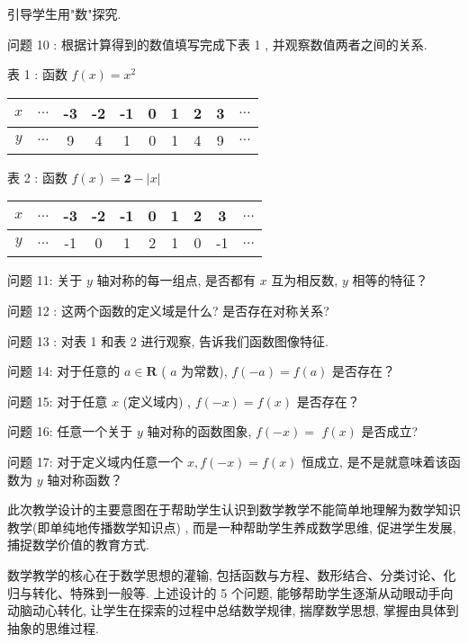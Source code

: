 \begin{activity}
	引导学生用"数"探究.

	问题 10 : 根据计算得到的数值填写完成下表 1 , 并观察数值两者之间的关系.

	表 1 : 函数 $f(x)=x^{2}$

	\begin{center}
		\begin{tabular}{|c|c|c|c|c|c|c|c|c|c|}
			\hline
			$x$ & $\ldots$ & -3 & -2 & -1 & 0 & 1 & 2 & 3 & $\ldots$ \\
			\hline
			$y$ & $\ldots$ & 9  & 4  & 1  & 0 & 1 & 4 & 9 & $\ldots$ \\
			\hline
		\end{tabular}
	\end{center}

	表 2 : 函数 $f(x)=\mathbf{2}-|x|$

	\begin{center}
		\begin{tabular}{|c|c|c|c|c|c|c|c|c|c|}
			\hline
			$x$ & $\ldots$ & -3 & -2 & -1 & 0 & 1 & 2 & 3  & $\ldots$ \\
			\hline
			$y$ & $\ldots$ & -1 & 0  & 1  & 2 & 1 & 0 & -1 & $\ldots$ \\
			\hline
		\end{tabular}
	\end{center}

	问题 11: 关于 $y$ 轴对称的每一组点, 是否都有 $x$ 互为相反数,  $y$ 相等的特征？

	问题 12 : 这两个函数的定义域是什么? 是否存在对称关系?

	问题 13 : 对表 1 和表 2 进行观察, 告诉我们函数图像特征.

	问题 14: 对于任意的 $a \in \mathbf{R}$ ( $a$ 为常数), $f(-a)=f(a)$ 是否存在？

	问题 15: 对于任意 $x$ (定义域内) ,  $f(-x)=f(x)$ 是否存在？

	问题 16: 任意一个关于 $y$ 轴对称的函数图象,  $f(-x)=$ $f(x)$ 是否成立?

	问题 17: 对于定义域内任意一个 $x, f(-x)=f(x)$ 恒成立, 是不是就意味着该函数为 $y$ 轴对称函数？

\end{activity}
\begin{purpose}
	此次教学设计的主要意图在于帮助学生认识到数学教学不能简单地理解为数学知识教学(即单纯地传播数学知识点) , 而是一种帮助学生养成数学思维, 促进学生发展, 捕捉数学价值的教育方式.

	数学教学的核心在于数学思想的灌输, 包括函数与方程、数形结合、分类讨论、化归与转化、特殊到一般等. 上述设计的 5 个问题, 能够帮助学生逐渐从动眼动手向动脑动心转化, 让学生在探索的过程中总结数学规律, 揣摩数学思想, 掌握由具体到抽象的思维过程.
\end{purpose}


